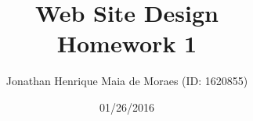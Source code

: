 \title{Web Site Design \\ Homework 1}
\author{Jonathan Henrique Maia de Moraes (ID: 1620855)}
\date{01/26/2016}
\maketitle
